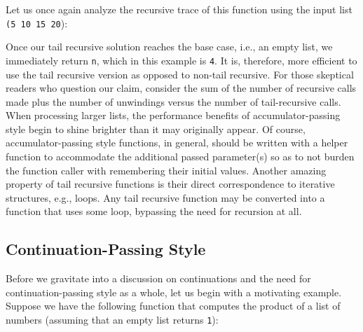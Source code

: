Let us once again analyze the recursive trace of this function using the input list \texttt{\textquotesingle(5 10 15 20}):

\begin{center}
\end{center}

Once our tail recursive solution reaches the base case, i.e., an empty list, we immediately return \texttt{n}, which in this example is \texttt{4}. It is, therefore, more efficient to use the tail recursive version as opposed to non-tail recursive. For those skeptical readers who question our claim, consider the sum of the number of recursive calls made plus the number of unwindings versus the number of tail-recursive calls. When processing larger lists, the performance benefits of accumulator-passing style begin to shine brighter than it may originally appear. Of course, accumulator-passing style functions, in general, should be written with a helper function to accommodate the additional passed parameter(s) so as to not burden the function caller with remembering their initial values. Another amazing property of tail recursive functions is their direct correspondence to iterative structures, e.g., loops. Any tail recursive function may be converted into a function that uses some loop, bypassing the need for recursion at all.

\subsection*{Continuation-Passing Style}
Before we gravitate into a discussion on continuations and the need for continuation-passing style as a whole, let us begin with a motivating example. Suppose we have the following function that computes the product of a list of numbers (assuming that an empty list returns \texttt{1}):

